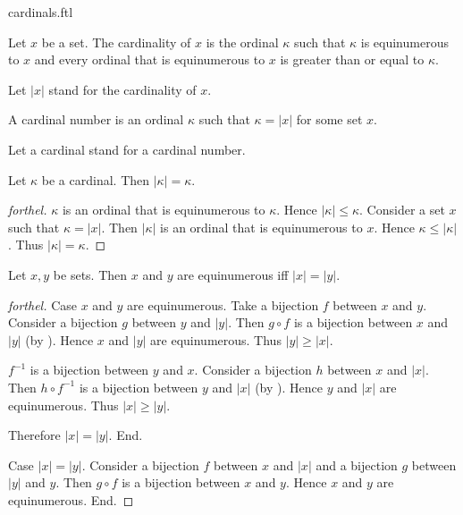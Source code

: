\documentclass{naproche-library}
\begin{document}
\begin{smodule}[title=Cardinal Numbers]{cardinals.ftl}

\begin{definition}[forthel,id=SET_THEORY_06_8286266038681600]
  Let $x$ be a set.
  The cardinality of $x$ is the ordinal $\kappa$ such that $\kappa$ is equinumerous to $x$ and every ordinal that is equinumerous to $x$ is greater than or equal to $\kappa$.

  Let $|x|$ stand for the cardinality of $x$.
\end{definition}

\begin{definition}[forthel,id=SET_THEORY_06_6818986081648640]
  A cardinal number is an ordinal $\kappa$ such that $\kappa = |x|$ for some
  set $x$.

  Let a cardinal stand for a cardinal number.
\end{definition}

\begin{proposition}[forthel,id=SET_THEORY_06_2820082336006144]
  Let $\kappa$ be a cardinal.
  Then $|\kappa| = \kappa$.
\end{proposition}
\begin{proof}[forthel]
  $\kappa$ is an ordinal that is equinumerous to $\kappa$.
  Hence $|\kappa| \leq \kappa$.
  Consider a set $x$ such that $\kappa = |x|$.
  Then $|\kappa|$ is an ordinal that is equinumerous to $x$.
  Hence $\kappa \leq |\kappa|$.
  Thus $|\kappa| = \kappa$.
\end{proof}

\begin{proposition}[forthel,id=SET_THEORY_06_6920913721229312]
  Let $x, y$ be sets.
  Then $x$ and $y$ are equinumerous iff $|x| = |y|$.
\end{proposition}
\begin{proof}[forthel]
  Case $x$ and $y$ are equinumerous.
    Take a bijection $f$ between $x$ and $y$.
    Consider a bijection $g$ between $y$ and $|y|$.
    Then $g \circ f$ is a bijection between $x$ and $|y|$ (by ).
    Hence $x$ and $|y|$ are equinumerous.
    Thus $|y| \geq |x|$.

    $f^{-1}$ is a bijection between $y$ and $x$.
    Consider a bijection $h$ between $x$ and $|x|$.
    Then $h \circ f^{-1}$ is a bijection between $y$ and $|x|$ (by ).
    Hence $y$ and $|x|$ are equinumerous.
    Thus $|x| \geq |y|$.

    Therefore $|x| = |y|$.
  End.

  Case $|x| = |y|$.
    Consider a bijection $f$ between $x$ and $|x|$ and a bijection $g$
    between $|y|$ and $y$.
    Then $g \circ f$ is a bijection between $x$ and $y$.
    Hence $x$ and $y$ are equinumerous.
  End.
\end{proof}
\end{smodule}
\end{document}
